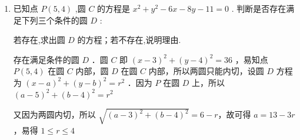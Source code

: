 \begin{enumerate}
\begin{jieda}
\begin{enumerate}
                半径$r = \dfrac{1}{2}\sqrt{(1-\lambda)^2+4(a+\lambda)^2-4(a+3\lambda)} = \dfrac{1}{2}\sqrt{5\lambda^2+(8a-14)\lambda + (4a^2-4a+1)}$，当$\lambda = \dfrac{7-4a}{5}$时，半径取得最小值，即以$A, B$为直径的圆，又因为该圆过原点，所以有$a + 3\lambda = 0$，两式联立$\left\{\begin{array}{l}
                 \lambda = \dfrac{7-4a}{5}  \\
                 a + 3\lambda = 0
            \end{array}\right.$，解得$\left\{\begin{array}{l}
                 \lambda = -1  \\
                 a = 3
            \end{array}\right.$.
            \item 方法2
            
            $x^2+y^2+(1-\lambda)x-2(a+\lambda)y+(a+3\lambda) = 0$应满足两个约束：过原点，圆心在$x + {2y} - 3 = 0$上

            满足过原点时方程变为$x^2+y^2+(1-\lambda)x+4\lambda y = 0$，圆心为$\left(\dfrac{\lambda-1}{2}, -2\lambda\right)$，代入直线方程可得$\lambda = -1$，故$a=3$.
        \end{enumerate}
        
    \end{jieda}

    \item 已知点 $P\left( {5,4}\right)$ ,圆 $C$ 的方程是 ${x}^{2} + {y}^{2} - {6x} - {8y} - {11} = 0$ . 判断是否存在满足下列三个条件的圆 $D$ : 
    若存在,求出圆 $D$ 的方程；若不存在,说明理由.
    \begin{jieda}
        存在满足条件的圆 $D$ ．圆 $C$ 即 $(x-3)^2+(y-4)^2=36$ ，易知点 $P(5,4)$ 在圆 $C$ 内部，圆 $D$ 在圆 $C$ 内部，所以两圆只能内切，设圆 $D$ 方程为 $(x-a)^2+(y-b)^2=r^2$ ．因为 $P$ 在圆 $D$ 上，所以 $(a-5)^2+(b-4)^2= r^2 $
        
        又因为两圆内切，所以 $\sqrt{(a-3)^2+(b-4)^2}=6-r$，故可得 $a=13-3 r$ ，易得 $1 \leqslant r \leqslant 4$
        
        

\end{jieda}
\end{enumerate}
